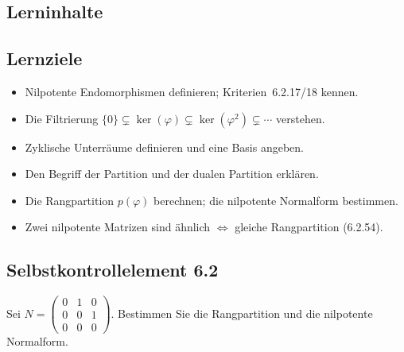 \documentclass[a4paper,12pt]{article}
\begin{document}
\subsection*{Lerninhalte}
\begin{center}
\end{center}

\subsection*{Lernziele}
\begin{itemize}
  \item Nilpotente Endomorphismen definieren; Kriterien~6.2.17/18 kennen.
  \item Die Filtrierung $\{0\} \subsetneq \ker(\varphi) \subsetneq \ker(\varphi^2) \subsetneq \cdots$ verstehen.
  \item Zyklische Unterräume definieren und eine Basis angeben.
  \item Den Begriff der Partition und der dualen Partition erklären.
  \item Die Rangpartition $p(\varphi)$ berechnen; die nilpotente Normalform bestimmen.
  \item Zwei nilpotente Matrizen sind ähnlich $\iff$ gleiche Rangpartition (6.2.54).
\end{itemize}

\subsection*{Selbstkontrollelement 6.2}
Sei $N = \begin{pmatrix}0&1&0\\0&0&1\\0&0&0\end{pmatrix}$. Bestimmen Sie die Rangpartition und die nilpotente Normalform.
\end{document}
